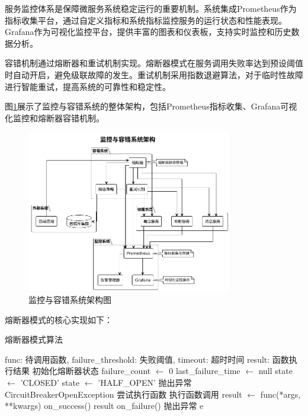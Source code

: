 服务监控体系是保障微服务系统稳定运行的重要机制。系统集成Prometheus作为指标收集平台，通过自定义指标和系统指标监控服务的运行状态和性能表现。Grafana作为可视化监控平台，提供丰富的图表和仪表板，支持实时监控和历史数据分析。

容错机制通过熔断器和重试机制实现。熔断器模式在服务调用失败率达到预设阈值时自动开启，避免级联故障的发生。重试机制采用指数退避算法，对于临时性故障进行智能重试，提高系统的可靠性和稳定性。

图\ref{fig:monitoring_fault_tolerance}展示了监控与容错系统的整体架构，包括Prometheus指标收集、Grafana可视化监控和熔断器容错机制。

\begin{figure}[H]
    \centering
    \includegraphics[width=0.8\textwidth]{chapters/fig-0/monitoring_fault_tolerance.png}
    \caption{监控与容错系统架构图}
    \label{fig:monitoring_fault_tolerance}
\end{figure}

熔断器模式的核心实现如下：

\begin{algorithm}[H]
\caption{熔断器模式算法}
\begin{algorithmic}[1]
\REQUIRE func: 待调用函数, failure\_threshold: 失败阈值, timeout: 超时时间
\ENSURE result: 函数执行结果
\STATE 初始化熔断器状态
\STATE failure\_count $\leftarrow$ 0
\STATE last\_failure\_time $\leftarrow$ null
\STATE state $\leftarrow$ 'CLOSED'
        \STATE state $\leftarrow$ 'HALF\_OPEN'
    \ELSE
        \STATE 抛出异常 CircuitBreakerOpenException
    \ENDIF
\ENDIF
\STATE 尝试执行函数
\STATE 执行函数调用
\STATE result $\leftarrow$ func(*args, **kwargs)
    \STATE on\_success()
    \RETURN result
\ELSE
    \STATE on\_failure()
    \STATE 抛出异常 e
\ENDIF
\end{algorithmic}
\end{algorithm}

